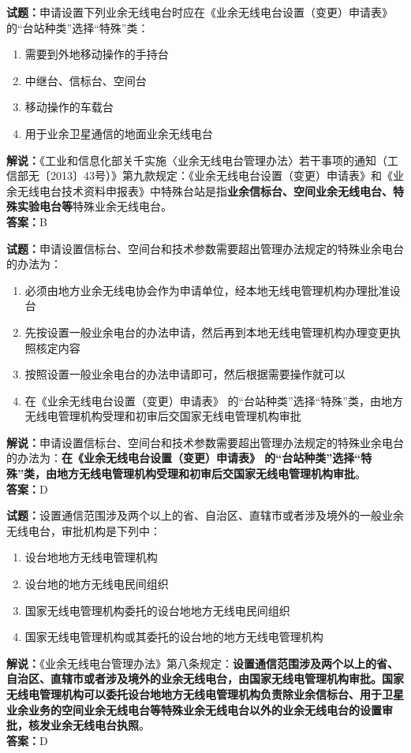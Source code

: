 \documentclass{ctexbook}
\begin{document}
\vspace{\baselineskip}

\noindent\textbf{试题：}申请设置下列业余无线电台时应在《业余无线电台设置（变更）申请表》 的“台站种类”选择“特殊”类：
\begin{enumerate}[leftmargin=3em]
  \item 需要到外地移动操作的手持台
  \item 中继台、信标台、空间台
  \item 移动操作的车载台
  \item 用于业余卫星通信的地面业余无线电台
\end{enumerate}
\noindent\textbf{解说：}《工业和信息化部关千实施〈业余无线电台管理办法〉若干事项的通知（工信部无〔2013〕43号）》第九款规定：《业余无线电台设置（变更）申请表》和《业余无线电台技术资料申报表》中特殊台站是指\textbf{业余信标台、空间业余无线电台、特殊实验电台等}特殊业余无线电台。\\\noindent\textbf{答案：}B

\vspace{\baselineskip}

\noindent\textbf{试题：}申请设置信标台、空间台和技术参数需要超出管理办法规定的特殊业余电台的办法为：
\begin{enumerate}[leftmargin=3em]
  \item 必须由地方业余无线电协会作为申请单位，经本地无线电管理机构办理批准设台
  \item 先按设置一般业余电台的办法申请，然后再到本地无线电管理机构办理变更执照核定内容
  \item 按照设置一般业余电台的办法申请即可，然后根据需要操作就可以
  \item 在《业余无线电台设置（变更）申请表》 的“台站种类”选择“特殊”类，由地方无线电管理机构受理和初审后交国家无线电管理机构审批
\end{enumerate}
\noindent\textbf{解说：}申请设置信标台、空间台和技术参数需要超出管理办法规定的特殊业余电台的办法为：\textbf{在《业余无线电台设置（变更）申请表》 的“台站种类”选择“特殊”类，由地方无线电管理机构受理和初审后交国家无线电管理机构审批}。\\\noindent\textbf{答案：}D

\vspace{\baselineskip}

\noindent\textbf{试题：}设置通信范围涉及两个以上的省、自治区、直辖市或者涉及境外的一般业余无线电台，审批机构是下列中：
\begin{enumerate}[leftmargin=3em]
  \item 设台地地方无线电管理机构
  \item 设台地的地方无线电民间组织
  \item 国家无线电管理机构委托的设台地地方无线电民间组织
  \item 国家无线电管理机构或其委托的设台地的地方无线电管理机构
\end{enumerate}
\noindent\textbf{解说：}《业余无线电台管理办法》第八条规定：\textbf{设置通信范围涉及两个以上的省、自治区、直辖市或者涉及境外的业余无线电台，由国家无线电管理机构审批。国家无线电管理机构可以委托设台地地方无线电管理机构负责除业余信标台、用于卫星业余业务的空间业余无线电台等特殊业余无线电台以外的业余无线电台的设置审批，核发业余无线电台执照}。\\\noindent\textbf{答案：}D
\end{document}
